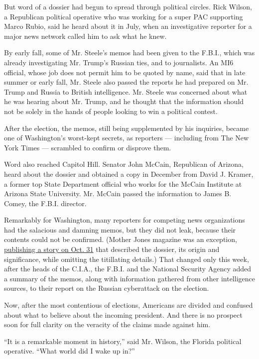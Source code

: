 But word of a dossier had begun to spread through political circles.
Rick Wilson, a Republican political operative who was working for a
super PAC supporting Marco Rubio, said he heard about it in July, when
an investigative reporter for a major news network called him to ask
what he knew.

By early fall, some of Mr. Steele's memos had been given to the F.B.I.,
which was already investigating Mr. Trump's Russian ties, and to
journalists. An MI6 official, whose job does not permit him to be quoted
by name, said that in late summer or early fall, Mr. Steele also passed
the reports he had prepared on Mr. Trump and Russia to British
intelligence. Mr. Steele was concerned about what he was hearing about
Mr. Trump, and he thought that the information should not be solely in
the hands of people looking to win a political contest.

After the election, the memos, still being supplemented by his
inquiries, became one of Washington's worst-kept secrets, as reporters
--- including from The New York Times --- scrambled to confirm or
disprove them.

Word also reached Capitol Hill. Senator John McCain, Republican of
Arizona, heard about the dossier and obtained a copy in December from
David J. Kramer, a former top State Department official who works for
the McCain Institute at Arizona State University. Mr. McCain passed the
information to James B. Comey, the F.B.I. director.

Remarkably for Washington, many reporters for competing news
organizations had the salacious and damning memos, but they did not
leak, because their contents could not be confirmed. (Mother Jones
magazine was an exception,
\href{http://www.motherjones.com/politics/2016/10/veteran-spy-gave-fbi-info-alleging-russian-operation-cultivate-donald-trump}{publishing
a story on Oct. 31} that described the dossier, its origin and
significance, while omitting the titillating details.) That changed only
this week, after the heads of the C.I.A., the F.B.I. and the National
Security Agency added a summary of the memos, along with information
gathered from other intelligence sources, to their report on the Russian
cyberattack on the election.

Now, after the most contentious of elections, Americans are divided and
confused about what to believe about the incoming president. And there
is no prospect soon for full clarity on the veracity of the claims made
against him.

``It is a remarkable moment in history,'' said Mr. Wilson, the Florida
political operative. ``What world did I wake up in?''

